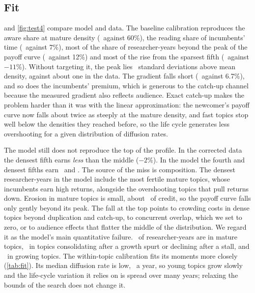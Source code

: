 \subsection{Fit}

 and \cref{fig:test4} compare model and data. The baseline
calibration reproduces the aware share at mature density (\calAware\ against
60\%), the reading share of incumbents' time (\calReadCS\ against 7\%), most of
the share of researcher-years beyond the peak of the payoff curve
(\calBeyond\ against 12\%) and most of the rise from the sparsest fifth
(\calQone\ against $-11\%$). Without targeting it, the peak lies \calZhat\
standard deviations above mean density, against about one in the data. The
gradient falls short (\calLin\ against 6.7\%), and so does the incumbents'
premium, which is generous to the catch-up channel because the measured
gradient also reflects audience. Exact catch-up makes the problem harder than
it was with the linear approximation: the newcomer's payoff curve now falls
about twice as steeply at the mature density, and fast topics stop well below
the densities they reached before, so the life cycle generates less
overshooting for a given distribution of diffusion rates.

The model still does not reproduce the top of the profile. In the corrected
data the densest fifth earns \emph{less} than the middle ($-2\%$). In the model
the fourth and densest fifths earn \calQfour\ and \calQfive. The source of the
miss is composition. The densest researcher-years in the model include the most
fertile mature topics, whose incumbents earn high returns, alongside the
overshooting topics that pull returns down. Erosion in mature topics is small,
about \calErosion\ of credit, so the payoff curve falls only gently beyond its
peak. The fall at the top points to crowding costs in dense topics beyond
duplication and catch-up, to concurrent overlap, which we set to zero, or to
audience effects that flatter the middle of the distribution. We regard it as
the model's main quantitative failure. \calShareMature\ of researcher-years are
in mature topics, \calShareCons\ in topics consolidating after a growth spurt or
declining after a stall, and \calShareGrowth\ in growing topics. The
within-topic calibration fits its moments more closely (\cref{tab:fit}). Its
median diffusion rate is low, \calWGmed\ a year, so young topics grow slowly and
the life-cycle variation it relies on is spread over many years; relaxing the
bounds of the search does not change it.

